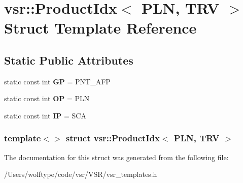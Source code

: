 \hypertarget{structvsr_1_1_product_idx_3_01_p_l_n_00_01_t_r_v_01_4}{\section{vsr\-:\-:Product\-Idx$<$ P\-L\-N, T\-R\-V $>$ Struct Template Reference}
\label{structvsr_1_1_product_idx_3_01_p_l_n_00_01_t_r_v_01_4}
}
\subsection*{Static Public Attributes}
\begin{DoxyCompactItemize}
\item 
\hypertarget{structvsr_1_1_product_idx_3_01_p_l_n_00_01_t_r_v_01_4_a9d9b6607a173bbdd6ba88cb8739ee9f7}{static const int {\bfseries G\-P} = P\-N\-T\-\_\-\-A\-F\-P}\label{structvsr_1_1_product_idx_3_01_p_l_n_00_01_t_r_v_01_4_a9d9b6607a173bbdd6ba88cb8739ee9f7}

\item 
\hypertarget{structvsr_1_1_product_idx_3_01_p_l_n_00_01_t_r_v_01_4_ae4769c059e20b8612c07bffe079edea0}{static const int {\bfseries O\-P} = P\-L\-N}\label{structvsr_1_1_product_idx_3_01_p_l_n_00_01_t_r_v_01_4_ae4769c059e20b8612c07bffe079edea0}

\item 
\hypertarget{structvsr_1_1_product_idx_3_01_p_l_n_00_01_t_r_v_01_4_a3a4eb3178f7be94b5acb255fef821f0d}{static const int {\bfseries I\-P} = S\-C\-A}\label{structvsr_1_1_product_idx_3_01_p_l_n_00_01_t_r_v_01_4_a3a4eb3178f7be94b5acb255fef821f0d}

\end{DoxyCompactItemize}
\subsubsection*{template$<$$>$ struct vsr\-::\-Product\-Idx$<$ P\-L\-N, T\-R\-V $>$}



The documentation for this struct was generated from the following file\-:\begin{DoxyCompactItemize}
\item 
/\-Users/wolftype/code/vsr/\-V\-S\-R/vsr\-\_\-templates.\-h\end{DoxyCompactItemize}
